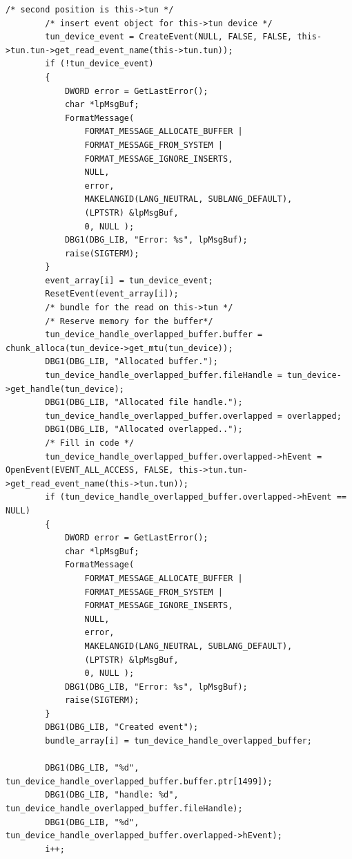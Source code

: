 \begin{lstlisting}[caption=Code für handle\_plain auf Windows]
        /* second position is this->tun */
        /* insert event object for this->tun device */
        tun_device_event = CreateEvent(NULL, FALSE, FALSE, this->tun.tun->get_read_event_name(this->tun.tun));
        if (!tun_device_event)
        {
            DWORD error = GetLastError();
            char *lpMsgBuf;
            FormatMessage(
                FORMAT_MESSAGE_ALLOCATE_BUFFER |
                FORMAT_MESSAGE_FROM_SYSTEM |
                FORMAT_MESSAGE_IGNORE_INSERTS,
                NULL,
                error,
                MAKELANGID(LANG_NEUTRAL, SUBLANG_DEFAULT),
                (LPTSTR) &lpMsgBuf,
                0, NULL );
            DBG1(DBG_LIB, "Error: %s", lpMsgBuf);
            raise(SIGTERM);
        }
        event_array[i] = tun_device_event;
        ResetEvent(event_array[i]);
        /* bundle for the read on this->tun */
        /* Reserve memory for the buffer*/
        tun_device_handle_overlapped_buffer.buffer = chunk_alloca(tun_device->get_mtu(tun_device));
        DBG1(DBG_LIB, "Allocated buffer.");
        tun_device_handle_overlapped_buffer.fileHandle = tun_device->get_handle(tun_device);
        DBG1(DBG_LIB, "Allocated file handle.");
        tun_device_handle_overlapped_buffer.overlapped = overlapped;
        DBG1(DBG_LIB, "Allocated overlapped..");
        /* Fill in code */
        tun_device_handle_overlapped_buffer.overlapped->hEvent = OpenEvent(EVENT_ALL_ACCESS, FALSE, this->tun.tun->get_read_event_name(this->tun.tun));
        if (tun_device_handle_overlapped_buffer.overlapped->hEvent == NULL)
        {
            DWORD error = GetLastError();
            char *lpMsgBuf;
            FormatMessage(
                FORMAT_MESSAGE_ALLOCATE_BUFFER |
                FORMAT_MESSAGE_FROM_SYSTEM |
                FORMAT_MESSAGE_IGNORE_INSERTS,
                NULL,
                error,
                MAKELANGID(LANG_NEUTRAL, SUBLANG_DEFAULT),
                (LPTSTR) &lpMsgBuf,
                0, NULL );
            DBG1(DBG_LIB, "Error: %s", lpMsgBuf);
            raise(SIGTERM);
        }
        DBG1(DBG_LIB, "Created event");
        bundle_array[i] = tun_device_handle_overlapped_buffer;

        DBG1(DBG_LIB, "%d", tun_device_handle_overlapped_buffer.buffer.ptr[1499]);
        DBG1(DBG_LIB, "handle: %d", tun_device_handle_overlapped_buffer.fileHandle);
        DBG1(DBG_LIB, "%d", tun_device_handle_overlapped_buffer.overlapped->hEvent);
        i++;


\end{lstlisting}
